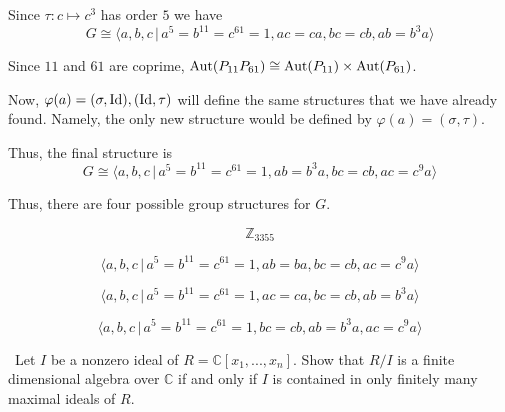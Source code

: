 \documentclass[12pt]{Qual}
\begin{document}
\begin{solution}
Since $\tau:c\mapsto c^3$ has order $5$ we have $$G\cong\langle a,b,c\,|\, a^5=b^{11}=c^{61}=1,ac=ca,bc=cb,ab=b^3a\rangle$$

 Since $11$ and $61$ are coprime, $\text{Aut}(P_{11}P_{61})\cong\text{Aut}(P_{11})\times\text{Aut}(P_{61})$.

Now, $\varphi(a)=(\sigma,\text{Id}),(\text{Id},\tau)$ will define the same structures that we have already found. Namely, the only new structure would be defined by $\varphi(a)=(\sigma,\tau)$.

Thus, the final structure is $$G\cong\langle a,b,c\,|\, a^5=b^{11}=c^{61}=1,ab=b^3a,bc=cb,ac=c^9a\rangle$$

Thus, there are four possible group structures for $G.$

\begin{center}
    \begin{framed}
    $$\mathbb{Z}_{3355}$$

    $$\langle a,b,c\,|\, a^5=b^{11}=c^{61}=1,ab=ba,bc=cb,ac=c^9a\rangle$$

    $$\langle a,b,c\,|\, a^5=b^{11}=c^{61}=1,ac=ca,bc=cb,ab=b^3a\rangle$$

    $$\langle a,b,c\,|\, a^5=b^{11}=c^{61}=1,bc=cb,ab=b^3a,ac=c^9a\rangle$$
    \end{framed}
\end{center}
\end{solution}
\newpage



\begin{problem} $\,$
Let $I$ be a nonzero ideal of $R=\mathbb{C}[x_1,...,x_n]$. Show that $R/I$ is a finite dimensional algebra over $\mathbb{C}$ if and only if $I$ is contained in only finitely many maximal ideals of $R.$
\end{problem}
\end{document}
